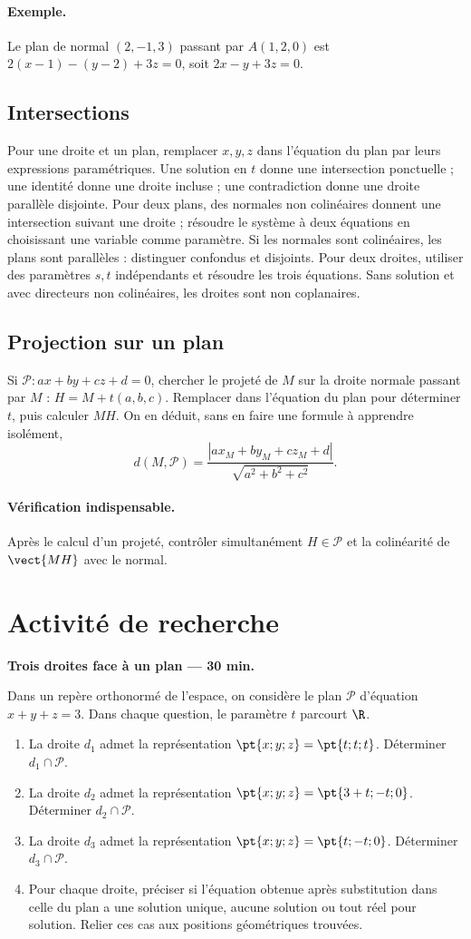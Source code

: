 \paragraph{Exemple.} Le plan de normal $(2,-1,3)$ passant par $A(1,2,0)$ est $2(x-1)-(y-2)+3z=0$, soit $2x-y+3z=0$.
\subsection{Intersections}
Pour une droite et un plan, remplacer $x,y,z$ dans l'équation du plan par leurs expressions paramétriques. Une solution en $t$ donne une intersection ponctuelle ; une identité donne une droite incluse ; une contradiction donne une droite parallèle disjointe.
Pour deux plans, des normales non colinéaires donnent une intersection suivant une droite ; résoudre le système à deux équations en choisissant une variable comme paramètre. Si les normales sont colinéaires, les plans sont parallèles : distinguer confondus et disjoints.
Pour deux droites, utiliser des paramètres $s,t$ indépendants et résoudre les trois équations. Sans solution et avec directeurs non colinéaires, les droites sont non coplanaires.
\subsection{Projection sur un plan}
Si $\mathcal P:ax+by+cz+d=0$, chercher le projeté de $M$ sur la droite normale passant par $M$ : $H=M+t(a,b,c)$. Remplacer dans l'équation du plan pour déterminer $t$, puis calculer $MH$.
On en déduit, sans en faire une formule à apprendre isolément,
\[d(M,\mathcal P)=\frac{|ax_M+by_M+cz_M+d|}{\sqrt{a^2+b^2+c^2}}.\]
\paragraph{Vérification indispensable.} Après le calcul d'un projeté, contrôler simultanément $H\in\mathcal P$ et la colinéarité de $\vect{MH}$ avec le normal.


\mxnewpage
\section{Activité de recherche}\textbf{Trois droites face à un plan --- 30 min.}\par Dans un repère orthonormé de l'espace, on considère le plan $\mathcal P$ d'équation $x+y+z=3$. Dans chaque question, le paramètre $t$ parcourt $\R$.
\begin{enumerate}\item La droite $d_1$ admet la représentation $\pt{x;y;z}=\pt{t;t;t}$. Déterminer $d_1\cap\mathcal P$.
\item La droite $d_2$ admet la représentation $\pt{x;y;z}=\pt{3+t;-t;0}$. Déterminer $d_2\cap\mathcal P$.
\item La droite $d_3$ admet la représentation $\pt{x;y;z}=\pt{t;-t;0}$. Déterminer $d_3\cap\mathcal P$.
\item Pour chaque droite, préciser si l'équation obtenue après substitution dans celle du plan a une solution unique, aucune solution ou tout réel pour solution. Relier ces cas aux positions géométriques trouvées.\end{enumerate}

